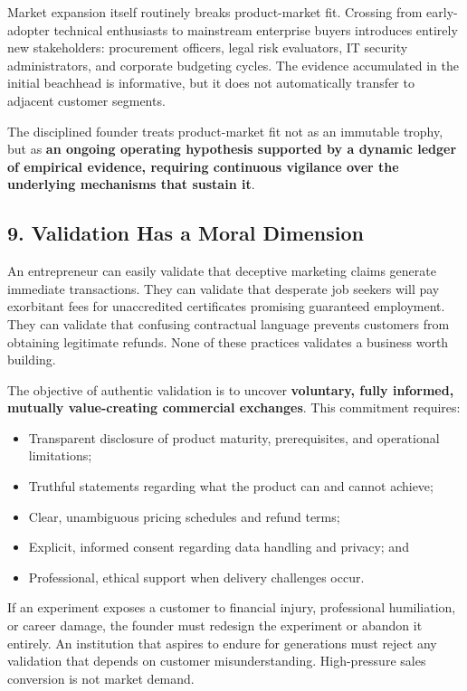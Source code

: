 Market expansion itself routinely breaks product-market fit. Crossing from early-adopter technical enthusiasts to mainstream enterprise buyers introduces entirely new stakeholders: procurement officers, legal risk evaluators, IT security administrators, and corporate budgeting cycles. The evidence accumulated in the initial beachhead is informative, but it does not automatically transfer to adjacent customer segments.

The disciplined founder treats product-market fit not as an immutable trophy, but as \textbf{an ongoing operating hypothesis supported by a dynamic ledger of empirical evidence, requiring continuous vigilance over the underlying mechanisms that sustain it}.

\subsection*{9. Validation Has a Moral Dimension}

An entrepreneur can easily validate that deceptive marketing claims generate immediate transactions. They can validate that desperate job seekers will pay exorbitant fees for unaccredited certificates promising guaranteed employment. They can validate that confusing contractual language prevents customers from obtaining legitimate refunds. None of these practices validates a business worth building.

The objective of authentic validation is to uncover \textbf{voluntary, fully informed, mutually value-creating commercial exchanges}. This commitment requires:
\begin{itemize}
    \item Transparent disclosure of product maturity, prerequisites, and operational limitations;
    \item Truthful statements regarding what the product can and cannot achieve;
    \item Clear, unambiguous pricing schedules and refund terms;
    \item Explicit, informed consent regarding data handling and privacy; and
    \item Professional, ethical support when delivery challenges occur.
\end{itemize}

If an experiment exposes a customer to financial injury, professional humiliation, or career damage, the founder must redesign the experiment or abandon it entirely. An institution that aspires to endure for generations must reject any validation that depends on customer misunderstanding. High-pressure sales conversion is not market demand.

